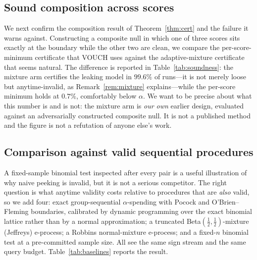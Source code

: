 \subsection{Sound composition across scores}\label{sec:exp-soundness}

We next confirm the composition result of Theorem~\ref{thm:cert} and the failure it
warns against. Constructing a composite null in which one of three scores sits exactly
at the boundary while the other two are clean, we compare the per-score-minimum
certificate that VOUCH uses against the adaptive-mixture certificate that seems
natural. The difference is reported in Table~\ref{tab:soundness}: the mixture arm
certifies the leaking model in $99.6\%$ of runs---it is not merely loose but
anytime-invalid, as Remark~\ref{rem:mixture} explains---while the per-score minimum
holds at $0.7\%$, comfortably below $\alpha$. We want to be precise about what this
number is and is not: the mixture arm is \emph{our own} earlier design, evaluated
against an adversarially constructed composite null. It is not a published method and
the figure is not a refutation of anyone else's work.

\begin{table}[t]
\centering\small
\caption{False certification under a composite null (score $A$ at the boundary
$p_0=0.55$, scores $B$ and $C$ clean; $2{,}048$ pairs, $\alpha=0.05$). The mixture arm
is our own earlier design, not a published method.}
\label{tab:soundness}

\end{table}

\subsection{Comparison against valid sequential procedures}\label{sec:exp-baselines}

A fixed-sample binomial test inspected after every pair is a useful illustration of
why naive peeking is invalid, but it is not a serious competitor. The right question is
what anytime validity costs relative to procedures that are \emph{also} valid, so we
add four: exact group-sequential $\alpha$-spending with Pocock and O'Brien--Fleming
boundaries, calibrated by dynamic programming over the exact binomial lattice rather
than by a normal approximation; a truncated Beta$(\tfrac12,\tfrac12)$-mixture
(Jeffreys) e-process; a Robbins normal-mixture e-process; and a fixed-$n$ binomial test
at a pre-committed sample size. All see the same sign stream and the same query
budget. Table~\ref{tab:baselines} reports the result.

